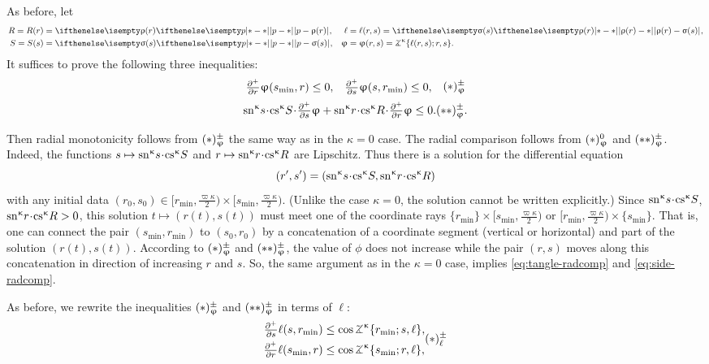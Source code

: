 As before, let
\begin{align*}
R=R(r)&=\dist{p}{\rho(r)}{},&\ell&=\ell(r,s)=\dist{\rho(r)}{\sigma(s)}{},
\\
S=S(s)&=\dist{p}{\sigma(s)}{},&\phi&=\phi(r,s)=\tangle\mc\kappa\{\ell(r,s);r,s\}.
\end{align*}
It suffices to prove the following three inequalities:
\[
\begin{aligned}
&\tfrac{\partial^+}{\partial r}\phi(s_{\min},r)\le 0, 
&
&\tfrac{\partial^+}{\partial s}\phi(s,r_{\min})\le 0,
\end{aligned}
\leqno(*)\mc\pm_\phi
\]
\[
\sn\kappa s\cdot\cs\kappa S\cdot\tfrac{\partial^+}{\partial s}\phi
+
\sn\kappa r\cdot\cs\kappa R\cdot\tfrac{\partial^+}{\partial r}\phi\le 0.
\leqno(**)\mc\pm_\phi.
\]

Then radial monotonicity follows from $(*)^{\pm}_\upvarphi$ the same way as in the $\kappa=0$ case.
The radial comparison follows from $(*)^{0}_\upvarphi$ and $(**)^{\pm}_\upvarphi$.
Indeed, the functions $s\mapsto \sn\kappa s\cdot\cs\kappa S$ and $r\mapsto \sn\kappa r\cdot\cs\kappa R$ are Lipschitz.
Thus there is a solution for the differential equation
\[(r',s')=(\sn\kappa s\cdot\cs\kappa S,\sn\kappa r\cdot\cs\kappa R)\] 
with any initial data $(r_0,s_0)\in[r_{\min},\tfrac{\varpi\kappa}2)\times[s_{\min},\tfrac{\varpi\kappa}2)$.
(Unlike the case $\kappa=0$, the solution cannot be written explicitly.)
Since $\sn\kappa s\cdot\cs\kappa S$, $\sn\kappa r\cdot\cs\kappa R>0$, this solution $t\mapsto(r(t),s(t))$ must meet one of the coordinate rays
$\{r_{\min}\}\times[s_{\min},\tfrac{\varpi\kappa}2)$ or $[r_{\min},\tfrac{\varpi\kappa}2)\times\{s_{\min}\}$.
That is, one can connect the pair $(s_{\min},r_{\min})$ to $(s_0,r_0)$ by a concatenation of a coordinate segment (vertical or horizontal) and part of the solution $(r(t),s(t))$.
According to $(*)^{\pm}_\upvarphi$ and $(**)^{\pm}_\upvarphi$, the value of $\phi$ does not increase while the pair $(r,s)$ moves along this concatenation in direction of increasing $r$ and $s$.
So, the same argument as in the $\kappa=0$ case, implies \ref{eq:tangle-radcomp} and \ref{eq:side-radcomp}.

As before, we rewrite the inequalities $(*)^{\pm}_\upvarphi$ and $(**)^{\pm}_\upvarphi$ in terms of $\ell$:
\[
\begin{aligned}
\tfrac{\partial^+}{\partial s}\ell(s,r_{\min})
&\le 
\cos\tangle\mc\kappa\{r_{\min};s,\ell\},
\\
\tfrac{\partial^+}{\partial r}\ell(s_{\min},r)
&\le 
\cos\tangle\mc\kappa\{s_{\min};r,\ell\},
\end{aligned}
\leqno(*)\mc\pm_\ell
\]

